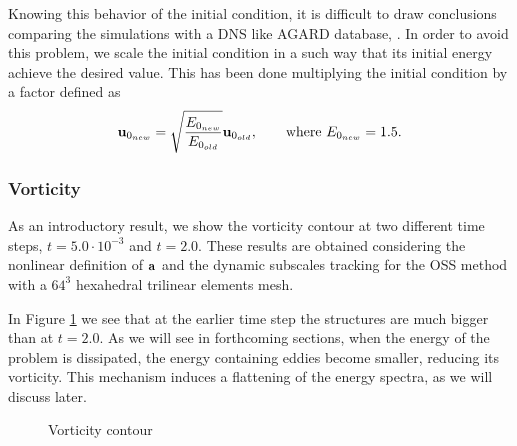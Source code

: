 Knowing this behavior of the initial condition, it is difficult to draw conclusions comparing the simulations with a DNS like AGARD database, \cite{_selection_????}. In order to avoid this problem, we scale the initial condition in a such way that its initial energy achieve the desired value. This has been done multiplying the initial condition by a factor defined as
$${\bf u}_{0_{new}}=\sqrt{\frac{E_{0_{new}}}{E_{0_{old}}}}{\bf u}_{0_{old}},\quad\quad\mbox{where $E_{0_{new}}=1.5$}.$$

\subsubsection{Vorticity}
As an introductory result, we show the vorticity contour at two different time steps, $t=5.0\cdot10^{-3}$ and $t=2.0$. These results are obtained considering the nonlinear definition of ${\bf a}$ and the dynamic subscales tracking for the OSS method with a $64^3$ hexahedral trilinear elements mesh. 

In Figure \ref{fig:vorti_contour} we see that at the earlier time step the structures are much bigger than at $ t=2.0 $. As we will see in forthcoming sections, when the energy of the problem is dissipated, the energy containing eddies become smaller, reducing its vorticity. This mechanism induces a flattening of the energy spectra, as we will discuss later.
\begin{figure}[h!]
  \centering
  \caption{Vorticity contour}
  \label{fig:vorti_contour}
\end{figure}

